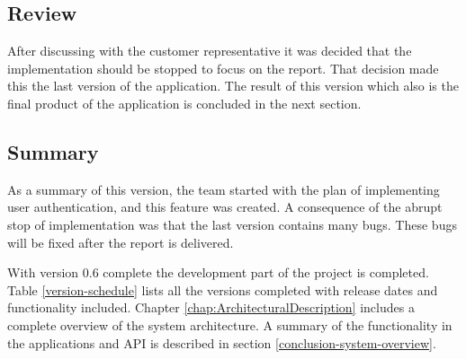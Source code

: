\subsection{Review}
After discussing with the customer representative it was decided that the implementation should be stopped to focus on the report. That decision made this the last version of the application. The result of this version which also is the final product of the application is concluded in the next section. 


\subsection{Summary}
As a summary of this version, the team started with the plan of implementing user authentication, and this feature was created. A consequence of the abrupt stop of implementation was that the last version contains many bugs. These bugs will be fixed after the report is delivered.

With version 0.6 complete the development part of the project is completed. Table \ref{version-schedule} lists all the versions completed with release dates and functionality included. Chapter \ref{chap:ArchitecturalDescription} includes a complete overview of the system architecture. A summary of the functionality in the applications and \gls{API} is described in section \ref{conclusion-system-overview}.

